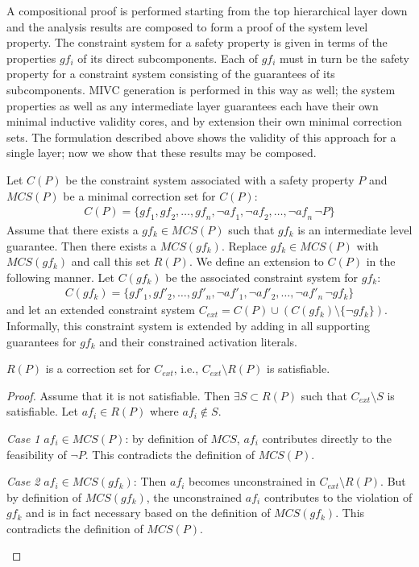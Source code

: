A compositional proof is performed starting from the top hierarchical layer down and the analysis results are composed to form a proof of the system level property. The constraint system for a safety property is given in terms of the properties $gf_i$ of its direct subcomponents. Each of $gf_i$ must in turn be the safety property for a constraint system consisting of the guarantees of its subcomponents. MIVC generation is performed in this way as well; the system properties as well as any intermediate layer guarantees each have their own minimal inductive validity cores, and by extension their own minimal correction sets. The formulation described above shows the validity of this approach for a single layer; now we show that these results may be composed. 

Let $C(P)$ be the constraint system associated with a safety property $P$ and $MCS(P)$ be a minimal correction set for $C(P)$:
\begin{gather*}
C(P) = \{\mathit{gf}_1,  \mathit{gf}_2, \dots ,\mathit{gf}_n,  \neg \mathit{af}_1,  \neg \mathit{af}_2, \dots, \neg \mathit{af}_n\, \neg P\}
\end{gather*}
Assume that there exists a $gf_k \in MCS(P)$ such that $gf_k$ is an intermediate level guarantee. Then there exists a $MCS(gf_k)$. Replace $gf_k \in MCS(P)$ with $MCS(gf_k)$ and call this set $R(P)$. We define an extension to $C(P)$ in the following manner. Let $C(gf_k)$ be the associated constraint system for $gf_k$:
\begin{gather*}
C(gf_k) = \{\mathit{gf}'_1,  \mathit{gf}'_2, \dots ,\mathit{gf}'_n,  \neg \mathit{af}'_1,  \neg \mathit{af}'_2, \dots, \neg \mathit{af}'_n\, \neg gf_k\}
\end{gather*}
and let an extended constraint system $C_{ext} = C(P) \cup (C(gf_k) \setminus \{\neg gf_k\})$. Informally, this constraint system is extended by adding in all supporting guarantees for $gf_k$ and their constrained activation literals. 

\begin{lemma} $R(P)$ is a correction set for $C_{ext}$, i.e., $C_{ext} \setminus R(P)$ is satisfiable. 
\begin{proof}
Assume that it is not satisfiable. Then $\exists S \subset R(P)$ such that $C_{ext} \setminus S$ is satisfiable. Let $af_i \in R(P)$ where $af_i \not \in S$. 

\textit{Case 1} $af_i \in MCS(P)$: by definition of $MCS$, $af_i$ contributes directly to the feasibility of $\neg P$. This contradicts the definition of $MCS(P)$.

\textit{Case 2} $af_i \in MCS(gf_k)$: Then $af_i$ becomes unconstrained in $C_{ext} \setminus R(P)$. But by definition of $MCS(gf_k)$, the unconstrained $af_i$ contributes to the violation of $gf_k$ and is in fact necessary based on the definition of $MCS(gf_k)$. This contradicts the definition of $MCS(P)$.

\label{lemma:corrSet1}
\end{proof}
\end{lemma}

